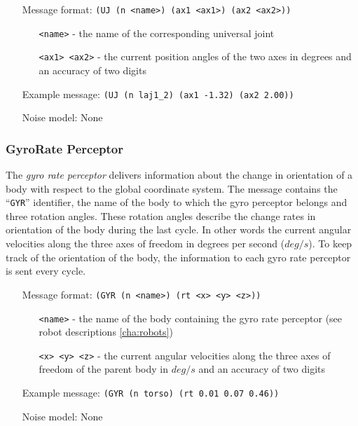 \begin{itemize}
	\item[Message format:] \texttt{(UJ (n <name>) (ax1 <ax1>) (ax2 <ax2>))}
		\begin{itemize}
		  \item[\texttt{<name>} -] the name of the corresponding universal joint
		  \item[\texttt{<ax1> <ax2>} -] the current position angles of the two axes in
		  degrees and an accuracy of two digits
		\end{itemize}
	\item[Example message:] \texttt{(UJ (n laj1\_2) (ax1 -1.32) (ax2 2.00))}
	\item[Noise model:] None
\end{itemize}



\subsubsection{GyroRate Perceptor}
\label{sec:GYR}
The \emph{gyro rate perceptor} delivers information about the change in
orientation of a body with respect to the global coordinate system. The message
contains the ``\texttt{GYR}'' identifier, the name of the body to which the gyro
perceptor belongs and three rotation angles. These rotation angles describe the
change rates in orientation of the body during the last cycle. In other words
the current angular velocities along the three axes of freedom in degrees per
second ($deg/s$). To keep track of the orientation of the body, the information
to each gyro rate perceptor is sent every cycle.
\begin{itemize}
	\item[Message format:] \texttt{(GYR (n <name>) (rt <x> <y> <z>))}
		\begin{itemize}
		  \item[\texttt{<name>} -] the name of the body containing the
		  gyro rate perceptor (see robot descriptions \ref{cha:robots})
		  \item[\texttt{<x> <y> <z>} -] the current angular velocities along the
		  three axes of freedom of the parent body in $deg/s$ and an accuracy of two
		  digits
		\end{itemize}
	\item[Example message:] \texttt{(GYR (n torso) (rt 0.01 0.07 0.46))}
	\item[Noise model:] None
\end{itemize}

